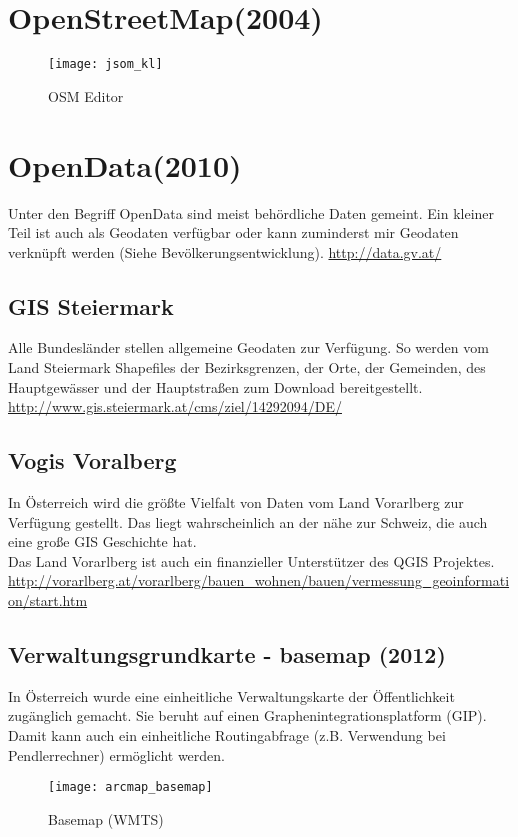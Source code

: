 \documentclass[11pt,fleqn]{book} %
\begin{document}
\section{OpenStreetMap(2004)}

\begin{figure}[h]
\centering\texttt{[image: jsom\_kl]}
\caption{OSM Editor}
\end{figure}

\section{OpenData(2010)}
Unter den Begriff OpenData sind meist beh\"ordliche Daten gemeint. Ein kleiner Teil ist auch als Geodaten verf\"ugbar oder kann zuminderst mir Geodaten verkn\"upft werden (Siehe Bev\"olkerungsentwicklung). \url{http://data.gv.at/} 
\subsection{GIS Steiermark}
Alle Bundesl\"ander stellen allgemeine Geodaten zur Verf\"ugung. So werden vom Land Steiermark  Shapefiles der Bezirksgrenzen, der Orte, der Gemeinden, des Hauptgew\"asser und der Hauptstra{\ss}en zum Download bereitgestellt. \url{http://www.gis.steiermark.at/cms/ziel/14292094/DE/} 

\subsection{Vogis Voralberg}
In \"Osterreich wird die gr\"o{\ss}te Vielfalt von Daten vom Land Vorarlberg zur Verf\"ugung gestellt. Das liegt wahrscheinlich an der n\"ahe zur Schweiz, die auch eine gro{\ss}e GIS Geschichte hat. \\
Das Land Vorarlberg ist auch ein finanzieller Unterst\"utzer des QGIS Projektes. \url{http://vorarlberg.at/vorarlberg/bauen_wohnen/bauen/vermessung_geoinformation/start.htm}
\subsection{Verwaltungsgrundkarte - basemap (2012)}
In \"Osterreich wurde eine einheitliche Verwaltungskarte der \"Offentlichkeit zug\"anglich gemacht. Sie beruht auf einen Graphenintegrationsplatform (GIP). Damit kann auch ein einheitliche Routingabfrage (z.B. Verwendung bei Pendlerrechner) erm\"oglicht werden. 
\begin{figure}[h]
\centering\texttt{[image: arcmap\_basemap]}
\caption{Basemap (WMTS)}
\end{figure}
\end{document}
